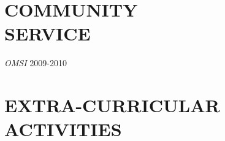 \documentclass[margin]{res}
\begin{document}
\begin{resume}
\begin{itemize}
                \end{itemize}
 
					 
\section{COMMUNITY \\ SERVICE}  
				{\sl OMSI} \hfil 2009-2010



\section{EXTRA-CURRICULAR \\ ACTIVITIES}             
				 

\end{resume}
\end{document}
